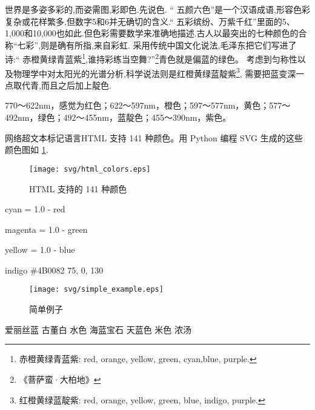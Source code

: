 \documentclass[main.tex]{subfiles}
\begin{document}
世界是多姿多彩的,而姿需图,彩即色.先说色.
“ 五颜六色”是一个汉语成语,形容色彩复杂或花样繁多,但数字5和6并无确切的含义.“ 
五彩缤纷、万紫千红”里面的5、1,000和10,000也如此.但色彩需要数学来准确地描述.古人以最突出的七种颜色的合称“七彩”,则是确有所指,来自彩虹.
采用传统中国文化说法,毛泽东把它们写进了诗:“ 赤橙黄绿青蓝紫\footnote{赤橙黄绿青蓝紫: red, orange, yellow, green, cyan,blue, purple.},谁持彩练当空舞?”\footnote{《菩萨蛮·大柏地》}青色就是偏蓝的绿色。
考虑到匀称性以及物理学中对太阳光的光谱分析,科学说法则是红橙黄绿蓝靛紫\footnote{红橙黄绿蓝靛紫: red, orange, yellow, green, blue, indigo, purple.},
需要把蓝变深一点取代青,而且之后加上靛色.

770～622nm，感觉为红色；622～597nm，橙色；597～577nm，黄色；577～492nm，绿色；492～455nm，蓝靛色；455～390nm，紫色。

网络超文本标记语言HTML 支持 141 种颜色。用 Python 编程 SVG 生成的这些颜色图如 \ref{fig:1.4.2}.

\begin{figure}
	\centering
	\texttt{[image: svg/html\_colors.eps]}
	\caption{HTML 支持的 141 种颜色}
	\label{fig:1.4.2}
\end{figure}
cyan = 1.0 - red

magenta = 1.0 - green

yellow = 1.0 - blue

indigo \#4B0082 75, 0, 130

\begin{figure}
	\centering
	\texttt{[image: svg/simple\_example.eps]}
	\caption{简单例子}
	\label{fig:I.1.}
\end{figure}



爱丽丝蓝%
古董白%
水色%
海蓝宝石%
天蓝色%
米色%
浓汤%
\end{document}
